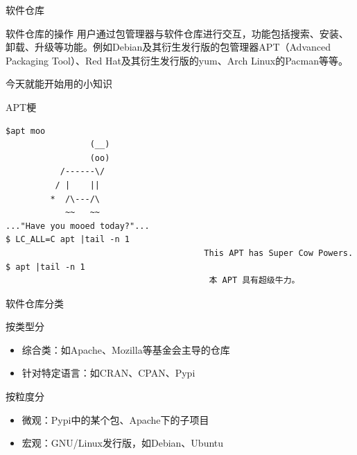 \documentclass{beamer}
\begin{document}
\begin{frame}[t]{软件仓库}
	\begin{block}{软件仓库的操作}
		用户通过包管理器与软件仓库进行交互，功能包括搜索、安装、卸载、升级等功能。例如Debian及其衍生发行版的包管理器APT（Advanced Packaging Tool）、Red Hat及其衍生发行版的yum、Arch Linux的Pacman等等。
	\end{block}
\end{frame}
\begin{frame}[t,fragile]{今天就能开始用的小知识}
	\begin{block}{APT梗}
	\scriptsize
	\begin{verbatim}
$apt moo
                 (__) 
                 (oo) 
           /------\/ 
          / |    ||   
         *  /\---/\ 
            ~~   ~~   
..."Have you mooed today?"...
$ LC_ALL=C apt |tail -n 1
                                        This APT has Super Cow Powers.
$ apt |tail -n 1
                                         本 APT 具有超级牛力。
\end{verbatim}
\end{block}
\end{frame}
\begin{frame}[t]{软件仓库分类}
    \begin{block}
        {按类型分}
        \begin{itemize}
            \item 综合类：如Apache、Mozilla等基金会主导的仓库
            \item 针对特定语言：如CRAN、CPAN、Pypi
        \end{itemize}
    \end{block}
    \begin{block}
        {按粒度分}
        \begin{itemize}
            \item 微观：Pypi中的某个包、Apache下的子项目
            \item 宏观：GNU/Linux发行版，如Debian、Ubuntu
        \end{itemize}
    \end{block}
\end{frame}
\end{document}
